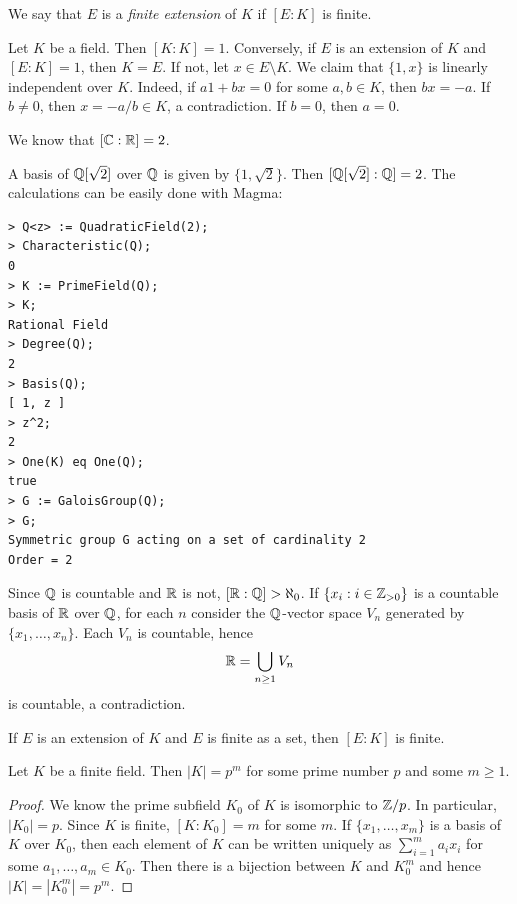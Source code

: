 We say that $E$ is a \emph{finite extension} of $K$ 
if $[E:K]$ is finite. 

\begin{example}
	Let $K$ be a field. Then $[K:K]=1$. Conversely, 
	if $E$ is an extension of $K$ and $[E:K]=1$, then $K=E$. 
	If not, let $x\in E\setminus K$. We claim that
	$\{1,x\}$ is linearly independent over $K$. Indeed, 
	if $a1+bx=0$ for some $a,b\in K$, then $bx=-a$. If 
	$b\ne 0$, then $x=-a/b\in K$, a contradiction. If $b=0$, then 
	$a=0$. 
\end{example}

We know that $[\mathbb{C}:\mathbb{R}]=2$. 

\begin{example}
	A basis of $\mathbb{Q}[\sqrt{2}]$ over $\mathbb{Q}$ 
	is given by $\{1,\sqrt{2}\}$. Then 
	$[\mathbb{Q}[\sqrt{2}]:\mathbb{Q}]=2$. The calculations 
	can be easily done with Magma:
\begin{lstlisting}
> Q<z> := QuadraticField(2);
> Characteristic(Q);
0
> K := PrimeField(Q);
> K;
Rational Field
> Degree(Q);
2
> Basis(Q);
[ 1, z ]
> z^2;
2
> One(K) eq One(Q);
true
> G := GaloisGroup(Q);
> G;
Symmetric group G acting on a set of cardinality 2
Order = 2
\end{lstlisting}
\end{example}

\begin{example}
	Since $\mathbb{Q}$ is countable and 
	$\mathbb{R}$ is not, $[\mathbb{R}:\mathbb{Q}]>\aleph_0$. If $\{x_i:i\in\mathbb{Z}_{>0}\}$ 
	is a countable basis of $\mathbb{R}$ over $\mathbb{Q}$, for each
	$n$ consider the $\mathbb{Q}$-vector space
	$V_n$ generated by $\{x_1,\dots,x_n\}$. 
	Each $V_n$ is countable, hence 
	\[
		\mathbb{R}=\bigcup_{n\geq1}V_n
	\]
	is countable, a contradiction.
\end{example}

If $E$ is an extension of $K$ and $E$ is finite as a set,
then $[E:K]$ is finite. 

\begin{proposition}
	Let $K$ be a finite field. Then $|K|=p^m$ 
	for some prime number $p$ and some $m\geq1$. 
\end{proposition}

\begin{proof}
	We know the prime subfield $K_0$ of $K$ is isomorphic to $\mathbb{Z}/p$. 
	In particular, $|K_0|=p$. Since $K$ is finite, 
	$[K:K_0]=m$ for some $m$. If $\{x_1,\dots,x_m\}$ is a basis
	of $K$ over $K_0$, then each element
	of $K$ can be written uniquely as
	$\sum_{i=1}^ma_ix_i$ for some $a_1,\dots,a_m\in K_0$. Then
	there is a bijection between $K$ and $K_0^m$ and hence $|K|=|K_0^m|=p^m$. 
\end{proof}

